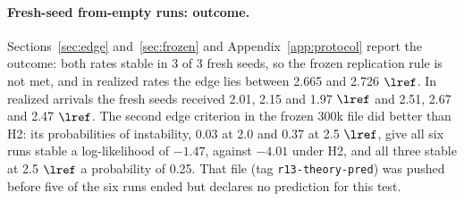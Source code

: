 \paragraph{Fresh-seed from-empty runs: outcome.} Sections~\ref{sec:edge} and~\ref{sec:frozen} and Appendix~\ref{app:protocol} report the outcome: both rates stable in 3 of 3 fresh seeds, so the frozen replication rule is not met, and in realized rates the edge lies between 2.665 and 2.726 $\lref$. In realized arrivals the fresh seeds received 2.01, 2.15 and 1.97 $\lref$ and 2.51, 2.67 and 2.47 $\lref$. The second edge criterion in the frozen 300k file did better than H2: its probabilities of instability, 0.03 at 2.0 and 0.37 at 2.5 $\lref$, give all six runs stable a log-likelihood of $-1.47$, against $-4.01$ under H2, and all three stable at 2.5 $\lref$ a probability of 0.25. That file (tag \texttt{r13-theory-pred}) was pushed before five of the six runs ended but declares no prediction for this test.


